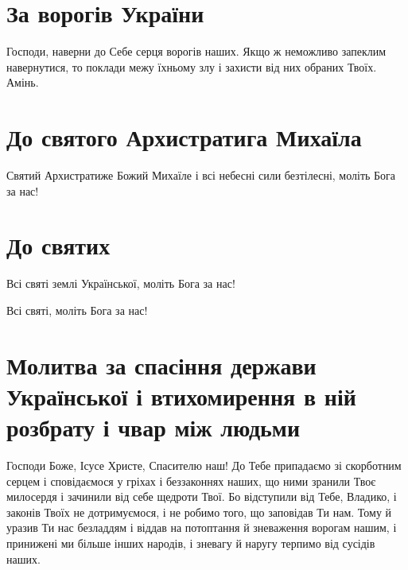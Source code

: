\documentclass[chapters.tex]{subfiles}
\begin{document}
\section{За ворогів України}
Господи, наверни до Себе серця ворогів наших. Якщо ж неможливо запеклим навернутися, то поклади межу їхньому злу і захисти від них обраних Твоїх. Амінь.

\section{До святого Архистратига Михаїла}
Святий Архистратиже Божий Михаїле і всі небесні сили безтілесні, моліть Бога за нас!

\section{До святих}
Всі святі землі Української, моліть Бога за нас!

Всі святі, моліть Бога за нас!

\section{Молитва за спасіння держави Української і втихомирення в ній розбрату і чвар між людьми}
Господи Боже, Ісусе Христе, Спасителю наш! До Тебе припадаємо зі скорботним серцем і сповідаємося у гріхах і беззаконнях наших, що ними зранили Твоє милосердя і зачинили від себе щедроти Твої. Бо відступили від Тебе, Владико, і законів Твоїх не дотримуємося, і не робимо того, що заповідав Ти нам. Тому й уразив Ти нас безладдям і віддав на потоптання й зневаження ворогам нашим, і принижені ми більше інших народів, і зневагу й наругу терпимо від сусідів наших.
\end{document}
